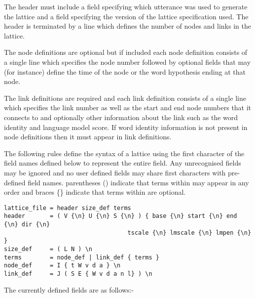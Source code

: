 The header must include a field specifying which utterance was used 
to generate the lattice and a field specifying the version of the 
lattice specification used.  The header is terminated by a line 
which defines the number of nodes and links in the lattice.

The node definitions are optional but if included each node definition 
consists of a single line which specifies the node number followed by
optional fields that may (for instance) define the time of the node or
the word hypothesis ending at that node.

The link definitions are required and each link definition consists of
a single line which specifies the link number as well as the start and 
end node numbers that it connects to and optionally other information
about the link such as the word identity and language model score.
If word identity information is not present in node definitions then it 
must appear in link definitions.


The following rules define the syntax of a lattice using the first 
character of the field names defined below to represent the 
entire field.
Any unrecognised fields may be ignored and no user defined fields 
may share first characters with pre-defined field names.
parentheses () indicate that terms within may appear in any order and
braces \{\} indicate that terms within are optional.

\begin{verbatim}
lattice_file = header size_def terms
header       = ( V {\n} U {\n} S {\n} ) { base {\n} start {\n} end {\n} dir {\n}
                                   tscale {\n} lmscale {\n} lmpen {\n} }
size_def     = ( L N ) \n
terms        = node_def | link_def { terms }
node_def     = I { t W v d a } \n
link_def     = J ( S E { W v d a n l} ) \n
\end{verbatim}


The currently defined fields are as follows:-

